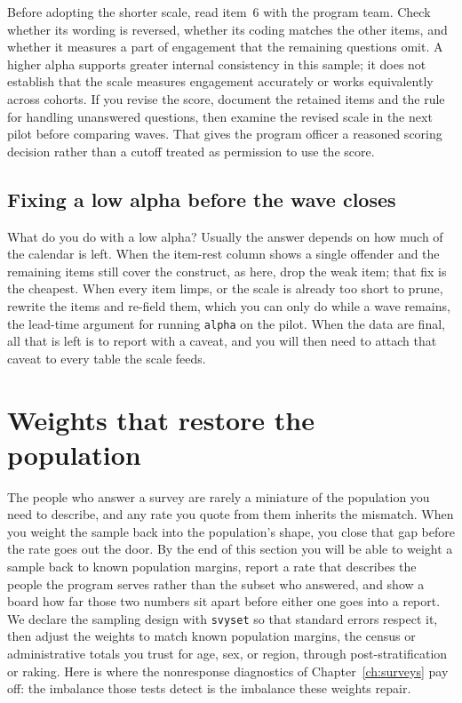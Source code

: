 \documentclass[
    a4paper,
    fontsize=10pt,
    twoside=true,
    numbers=noenddot,
]{kaobook}
\begin{document}
Before adopting the shorter scale, read item~6 with the program team. Check whether its wording is reversed, whether its coding matches the other items, and whether it measures a part of engagement that the remaining questions omit. A higher alpha supports greater internal consistency in this sample; it does not establish that the scale measures engagement accurately or works equivalently across cohorts. If you revise the score, document the retained items and the rule for handling unanswered questions, then examine the revised scale in the next pilot before comparing waves. That gives the program officer a reasoned scoring decision rather than a cutoff treated as permission to use the score.

\subsection{Fixing a low alpha before the wave closes}\label{sec:alpha-fix}
What do you do with a low alpha? Usually the answer depends on how much of the calendar is left. When the item-rest column shows a single offender and the remaining items still cover the construct, as here, drop the weak item; that fix is the cheapest. When every item limps, or the scale is already too short to prune, rewrite the items and re-field them, which you can only do while a wave remains, the lead-time argument for running \texttt{alpha} on the pilot. When the data are final, all that is left is to report with a caveat, and you will then need to attach that caveat to every table the scale feeds.

\section{Weights that restore the population}\label{sec:weights}
The people who answer a survey are rarely a miniature of the population you need to describe, and any rate you quote from them inherits the mismatch. When you weight the sample back into the population's shape, you close that gap before the rate goes out the door. By the end of this section you will be able to weight a sample back to known population margins, report a rate that describes the people the program serves rather than the subset who answered, and show a board how far those two numbers sit apart before either one goes into a report. We declare the sampling design with \texttt{svyset} so that standard errors respect it, then adjust the weights to match known population margins, the census or administrative totals you trust for age, sex, or region, through post-stratification or raking. Here is where the nonresponse diagnostics of Chapter~\ref{ch:surveys} pay off: the imbalance those tests detect is the imbalance these weights repair.
\end{document}
